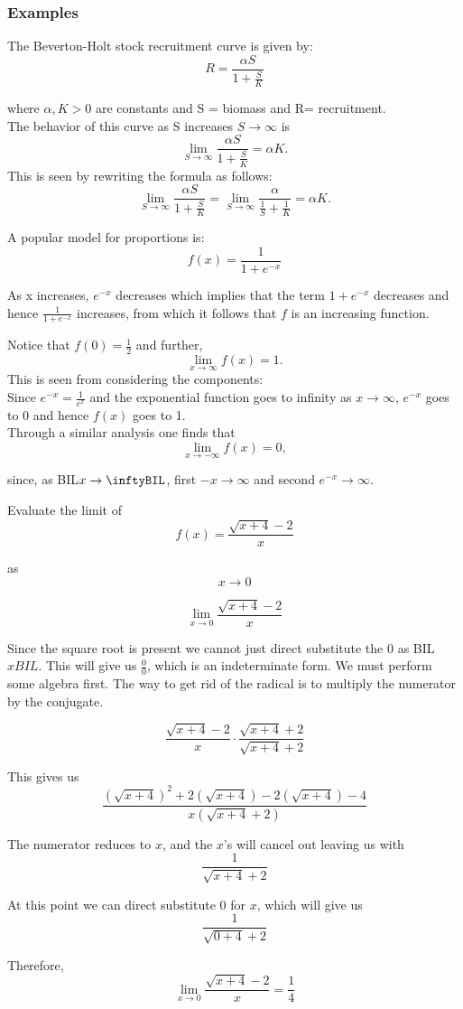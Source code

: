 \documentclass[12pt,a4paper]{article}
\theoremstyle{regla}
\theoremstyle{remark}
\theoremstyle{definition}
\theoremstyle{nonumberbreak}
\begin{document}
\subsubsection{Examples}
\begin{xmpl}
The Beverton-Holt stock recruitment curve is given by:
$$
R=\frac{\alpha S}{1+\frac{S}{K}}
$$

where $\alpha, K >0$ are constants and S = biomass and R= recruitment.\\

The behavior of this curve as S increases $S\rightarrow\infty$ is
$$
\lim_{S\to\infty}\frac{\alpha S}{1+\frac{S}{K}} =\alpha K .
$$
This is seen by rewriting the formula as follows:
$$
\lim_{S\to\infty}\frac{\alpha S}{1+\frac{S}{K}} =
\lim_{S\to\infty}\frac{\alpha }{\frac{1}{S}+\frac{1}{K}} =\alpha K .
$$

\end{xmpl}
\begin{xmpl}
A popular model for proportions is: 
$$
f(x) = \frac{1}{1+e^{-x}}
$$

As x increases, $e^{-x}$ decreases which implies that the
term $1+e^{-x}$ decreases and hence
$\frac{1}{1+e^{-x}}$ increases, from which it follows that $f$ is an
increasing function.

Notice that $f(0)=\frac{1}{2}$ and further, 
$$\lim_{x\to\infty} f(x) = 1.$$
This is seen from considering the 
components: \\
Since $e^{-x} = \frac{1}{e^{x}}$ and the exponential function goes to infinity as $x\to\infty$, $e^{-x}$
goes to $0$ and hence $f(x)$ goes to 1.\\

Through a similar analysis one finds that 
$$\lim_{x\to-\infty} f(x)=0 ,$$

 

since, as BIL$x\rightarrow \inftyBIL$, first $-x\rightarrow \infty$ and second $e^{-x} \rightarrow \infty$.
\end{xmpl}
\begin{xmpl}
Evaluate the limit of $$f(x) = \frac{\sqrt{x + 4} - 2}{x}$$

as $$x \to 0$$

$$\lim_{x \to 0} \frac{\sqrt{x + 4} - 2}{x}$$

Since the square root is present we cannot just direct substitute the 0 as BIL$xBIL$. This will give us $\frac{0}{0}$, which is an indeterminate form. We must perform some algebra first. The way to get rid of the radical is to multiply the numerator by the conjugate.

$$\frac{\sqrt{x + 4} - 2}{x} \cdot \frac{\sqrt{x + 4} + 2}{\sqrt{x + 4} + 2}$$

This gives us $$\frac{(\sqrt{x + 4})^2 + 2(\sqrt{x+4}) - 2(\sqrt{x+4}) -4}{x(\sqrt{x + 4} + 2)}$$

The numerator reduces to $x$, and the $x$'s will cancel out leaving us with $$\frac{1}{\sqrt{x + 4} + 2}$$

At this point we can direct substitute 0 for $x$, which will give us $$\frac{1}{\sqrt{0 + 4} + 2}$$

Therefore, $$\lim_{x \to 0} \frac{\sqrt{x + 4} - 2}{x} = \frac{1}{4}$$
\end{xmpl}
\end{document}
